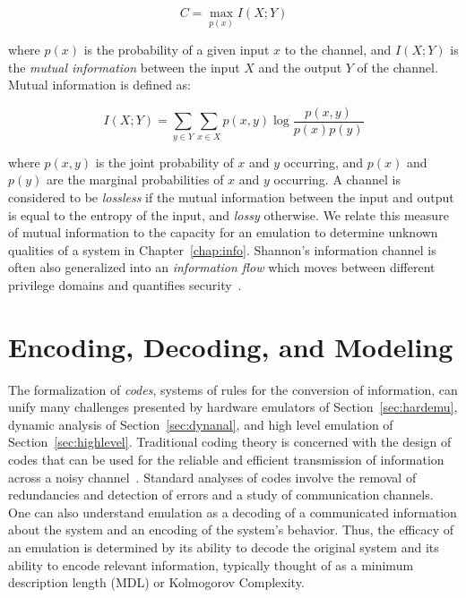 \begin{equation}
C = \max_{p(x)} I(X;Y)
\end{equation}

\noindent
where $p(x)$ is the probability of a given input $x$ to the channel, and $I(X;Y)$ is the \emph{mutual information} between the input $X$ and the output $Y$ of the channel.
Mutual information is defined as:

\begin{equation}
I(X;Y) = \sum_{y \in Y} \sum_{x \in X} p(x,y) \log \frac{p(x,y)}{p(x)p(y)}
\end{equation}

\noindent
where $p(x,y)$ is the joint probability of $x$ and $y$ occurring, and $p(x)$ and $p(y)$ are the marginal probabilities of $x$ and $y$ occurring.
A channel is considered to be \emph{lossless} if the mutual information between the input and output is equal to the entropy of the input, and \emph{lossy} otherwise.
We relate this measure of mutual information to the capacity for an emulation to determine unknown qualities of a system in Chapter~\ref{chap:info}.
Shannon's information channel is often also generalized into an \emph{information flow} which moves between different privilege domains and quantifies security~\cite{sabelfeld2003language, lowe2002quantifying}.

\section{Encoding, Decoding, and Modeling}

The formalization of \emph{codes}, systems of rules for the conversion of information, can unify many challenges presented by hardware emulators of Section~\ref{sec:hardemu}, dynamic analysis of Section~\ref{sec:dynanal}, and high level emulation of Section~\ref{sec:highlevel}.
Traditional coding theory is concerned with the design of codes that can be used for the reliable and efficient transmission of information across a noisy channel~\cite{van1971coding, richardson2008modern, bierbrauer2016introduction}.
Standard analyses of codes involve the removal of redundancies and detection of errors and a study of communication channels.
One can also understand emulation as a decoding of a communicated information about the system and an encoding of the system's behavior.
Thus, the efficacy of an emulation is determined by its ability to decode the original system and its ability to encode relevant information, typically thought of as a minimum description length (MDL) or Kolmogorov Complexity.

